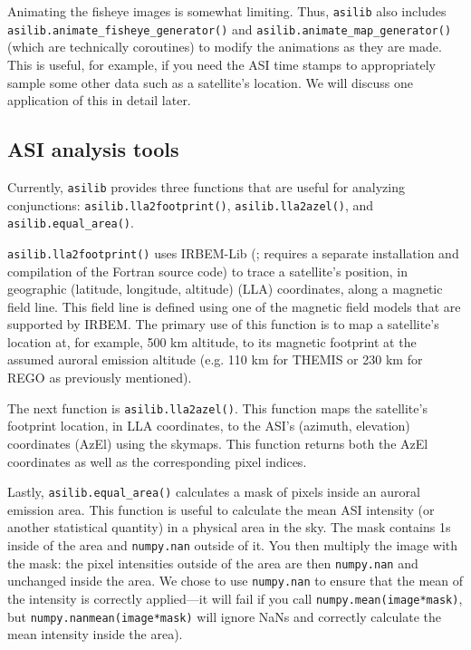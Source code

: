 \documentclass[utf8]{FrontiersinHarvard} %
\begin{document}
Animating the fisheye images is somewhat limiting. Thus, \verb|asilib| also includes \verb|asilib.animate_fisheye_generator()| and \verb|asilib.animate_map_generator()| (which are technically coroutines) to modify the animations as they are made. This is useful, for example, if you need the ASI time stamps to appropriately sample some other data such as a satellite's location. We will discuss one application of this in detail later.

\subsection{ASI analysis tools}
Currently, \verb|asilib| provides three functions that are useful for analyzing conjunctions: \verb|asilib.lla2footprint()|, \verb|asilib.lla2azel()|, and \verb|asilib.equal_area()|.

\verb|asilib.lla2footprint()| uses IRBEM-Lib (\citep{irbem}; requires a separate installation and compilation of the Fortran source code) to trace a satellite's position, in geographic (latitude, longitude, altitude) (LLA) coordinates, along a magnetic field line. This field line is defined using one of the magnetic field models that are supported by IRBEM. The primary use of this function is to map a satellite's location at, for example, 500 km altitude, to its magnetic footprint at the assumed auroral emission altitude (e.g. 110 km for THEMIS or 230 km for REGO as previously mentioned).

The next function is \verb|asilib.lla2azel()|. This function maps the satellite's footprint location, in LLA coordinates, to the ASI's (azimuth, elevation) coordinates (AzEl) using the skymaps. This function returns both the AzEl coordinates as well as the corresponding pixel indices.

Lastly, \verb|asilib.equal_area()| calculates a mask of pixels inside an auroral emission area. This function is useful to calculate the mean ASI intensity (or another statistical quantity) in a physical area in the sky. The mask contains 1s inside of the area and \verb|numpy.nan| outside of it. You then multiply the image with the mask: the pixel intensities outside of the area are then \verb|numpy.nan| and unchanged inside the area. We chose to use \verb|numpy.nan| to ensure that the mean of the intensity is correctly applied---it will fail if you call \verb|numpy.mean(image*mask)|, but \verb|numpy.nanmean(image*mask)| will ignore NaNs and correctly calculate the mean intensity inside the area).
\end{document}
